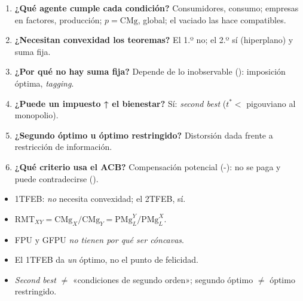\documentclass{article}
\begin{document}
\begin{columnas}
\begin{enumerate}
\item \textbf{¿Qué agente cumple cada condición?} Consumidores, consumo; empresas en factores, producción; $p=\mathrm{CMg}$, global; el vaciado las hace compatibles.
\item \textbf{¿Necesitan convexidad los teoremas?} El 1.º no; el 2.º sí (hiperplano) y suma fija.
\item \textbf{¿Por qué no hay suma fija?} Depende de lo inobservable (): imposición óptima, \emph{tagging}.
\item \textbf{¿Puede un impuesto ↑ el bienestar?} Sí: \emph{second best} ($t^*<$ pigouviano al monopolio).
\item \textbf{¿Segundo óptimo u óptimo restringido?} Distorsión dada frente a restricción de información.
\item \textbf{¿Qué criterio usa el ACB?} Compensación potencial (-): no se paga y puede contradecirse ().
\end{enumerate}

\begin{trampa}
\begin{itemize}
\item 1TFEB: \emph{no} necesita convexidad; el 2TFEB, sí.
\item $\mathrm{RMT}_{XY}=\mathrm{CMg}_X/\mathrm{CMg}_Y=\mathrm{PMg}^Y_L/\mathrm{PMg}^X_L$.
\item FPU y GFPU \emph{no tienen por qué ser cóncavas}.
\item El 1TFEB da \emph{un} óptimo, no el punto de felicidad.
\item \emph{Second best} $\neq$ «condiciones de segundo orden»; segundo óptimo $\neq$ óptimo restringido.
\end{itemize}
\end{trampa}

\end{columnas}
\end{document}
